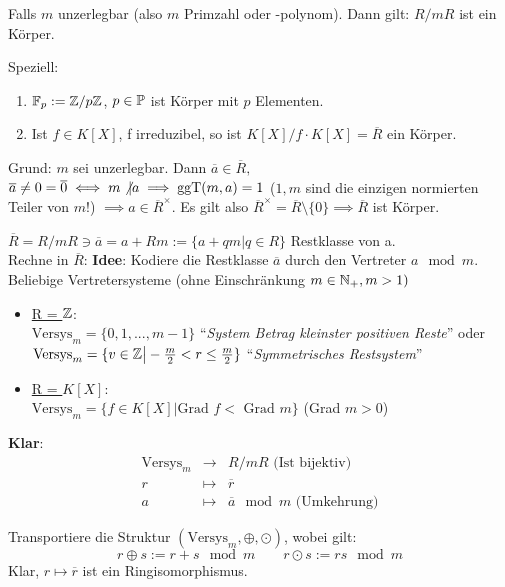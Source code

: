 \documentclass[a4paper,twoside,DIV15,BCOR12mm]{scrbook}
\begin{document}
\begin{folgerung}
Falls $m$ unzerlegbar (also $m$ Primzahl oder -polynom). Dann gilt:
$R/mR$ ist ein Körper.
\end{folgerung}

Speziell:
\begin{enumerate}
\item  $\mathbb{F}_p := \mathbb{Z}/p\mathbb{Z}$, $p\in\mathbb{P}$ ist Körper mit $p$ Elementen.
\item Ist $f\in K[X]$, f irreduzibel, so ist $K[X]/f\cdot K[X] = \overline R$ ein Körper.
\end{enumerate}

Grund: $m$ sei unzerlegbar. Dann $\overline a \in \overline R,$
$\overline a\ne 0 = \overline 0 \iff m\not|a \implies \mathop{\rm ggT}\nolimits(m,a) = 1$
($1,m$ sind die einzigen normierten Teiler von $m$!) $\implies a \in
\overline R^\times$. Es gilt also $\overline R^\times = \overline
R\setminus\{0\} \implies \overline R$ ist Körper.


$\overline R = R/mR \ni \overline a = a + Rm := \{a + qm \big| q \in R\}$ Restklasse von a.\\
Rechne in $\overline R$:
\textbf{Idee}: Kodiere die Restklasse $\overline a$ durch den Vertreter $a \mod m$.\\

Beliebige Vertretersysteme (ohne Einschränkung $m \in \mathbb{N}_+, m >
1)$
\begin{itemize}
    \item[] \underline{R = $\mathbb{Z}$}: \\$\text{Versys}_m = \{0,1,...,m-1\}$ "`\emph{System Betrag kleinster positiven Reste}"' oder $\text{Versys}_m =\{v \in \mathbb{Z} \big| - \frac{m}{2} < r \le \frac{m}{2}\}$ "`\emph{Symmetrisches Restsystem}"'
    \item[] \underline{R = $K[X]$}: \\$\text{Versys}_m = \{f \in K[X] \big| \text{Grad } f < \text{ Grad } m\}$ (Grad $m > 0$)
\end{itemize}

\textbf{Klar}:
\[\begin{array}{rcl}
        \text{Versys}_m & \longrightarrow & R/mR \text{ (Ist bijektiv)}\\
        r & \longmapsto & \overline r\\
        a & \longmapsto & \overline a \mod m \text{ (Umkehrung)}
    \end{array}
\]

Transportiere die Struktur $(\text{Versys}_m, \oplus, \odot)$, wobei
gilt:
\[
    r \oplus s := r+s \mod m \qquad
    r \odot s := rs \mod m
\]
Klar, $r \mapsto \overline r$ ist ein Ringisomorphismus.
\end{document}
